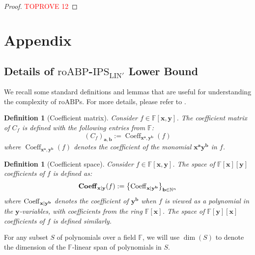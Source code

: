 \documentclass[11pt]{article}
\newtheorem{definition}[theorem]{Definition}
\newcommand{\F}{\mathbb{F}}
\newcommand{\IPSLINp}{\mathrm{IPS}_{\mathrm{LIN}'}}
\newcommand{\roABP}{\mathrm{roABP}}
\begin{document}
\multsymposchar*

\begin{proof}\textcolor{red}{TOPROVE 12}\end{proof}


\medskip

\printbibliography[
heading=bibintoc,
title={References}
]

\appendix



\section{Appendix}
\subsection{Details of $\roABP$-$\IPSLINp$ Lower Bound}

We recall some standard definitions and lemmas that are useful for understanding the complexity of $\roABP$s. For more details, please refer to \cite{FSTW21,Forbes-thesis}.
\begin{definition}[Coefficient matrix]
    Consider $f \in \F[\mathbf{x},\mathbf{y}]$. The coefficient matrix of $C_f$ is defined with the following entries from $\F$: 
    $$(C_f)_{\mathbf{a},\mathbf{b}} := \operatorname{Coeff}_{\mathbf{x}^{\mathbf{a}},\mathbf{y}^{\mathbf{b}}}(f)$$
    where $\operatorname{Coeff}_{\mathbf{x}^{\mathbf{a}},\mathbf{y}^{\mathbf{b}}}(f)$ denotes the coefficient of the monomial $\mathbf{x}^{\mathbf{a}}\mathbf{y}^{\mathbf{b}}$ in $f$. 
\end{definition}

\begin{definition}[Coefficient space]
    Consider $f \in \F[\mathbf{x},\mathbf{y}]$. The \emph{space of $\F[\mathbf{x}][\mathbf{y}]$ coefficients of $f$} is defined as: $$ \operatorname{\mathbf{Coeff}}_{\mathbf{x}|\mathbf{y}}(f) := \left\{ \operatorname{Coeff}_{\mathbf{x}|\mathbf{y}^{\mathbf{b}}} \right\}_{\mathbf{b}\in \mathbb{N}^{n}}$$ where $\operatorname{Coeff}_{\mathbf{x}|\mathbf{y}^{\mathbf{b}}}$ denotes the coefficient of $\mathbf{y}^{\mathbf{b}}$ when $f$ is viewed as a polynomial in the $\mathbf{y}$-variables, with coefficients from the ring $\F[\mathbf{x}]$. The \emph{space of $\F[\mathbf{y}][\mathbf{x}]$ coefficients of $f$} is defined similarly.
\end{definition}

For any subset $S$ of polynomials over a field $\F$, we will use $\dim(S)$ to denote the dimension of the $\F$-linear span of polynomials in $S$. 
\end{document}
